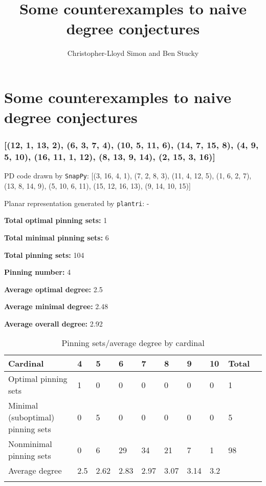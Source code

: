\documentclass{article}%
\title{Some counterexamples to naive degree conjectures}
\author{Christopher-Lloyd Simon and Ben Stucky}
\begin{document}
%

\section{Some counterexamples to naive degree conjectures}

\subsubsection{[(12, 1, 13, 2), (6, 3, 7, 4), (10, 5, 11, 6), (14, 7, 15, 8), (4, 9, 5, 10), (16, 11, 1, 12), (8, 13, 9, 14), (2, 15, 3, 16)]}

{\small\noindent PD code drawn by \texttt{SnapPy}: [(3, 16, 4, 1), (7, 2, 8, 3), (11, 4, 12, 5), (1, 6, 2, 7), (13, 8, 14, 9), (5, 10, 6, 11), (15, 12, 16, 13), (9, 14, 10, 15)]}

{\small\noindent Planar representation generated by \texttt{plantri}: -}

\begin{multicols}{2}
{\normalsize \noindent\textbf{Total optimal pinning sets:} 1

\noindent\textbf{Total minimal pinning sets:} 6

\noindent\textbf{Total pinning sets:} 104

\noindent\textbf{Pinning number:} 4

}
\columnbreak

{\normalsize \noindent\textbf{Average optimal degree:} 2.5

\noindent\textbf{Average minimal degree:} 2.48

\noindent\textbf{Average overall degree:} 2.92

}
\end{multicols}

\begin{table}[ht]
	\caption{Pinning sets/average degree by cardinal}
	\centering
	\renewcommand{\arraystretch}{1.5}
	\begin{tabularx}{\textwidth}{lXXXXXXXXX}
		\toprule
			Cardinal & 4 & 5 & 6 & 7 & 8 & 9 & 10 & Total\\
			\hline
			Optimal pinning sets & 1 & 0 & 0 & 0 & 0 & 0 & 0 & 1 \\
			Minimal (suboptimal) pinning sets & 0 & 5 & 0 & 0 & 0 & 0 & 0 & 5 \\
			Nonminimal pinning sets & 0 & 6 & 29 & 34 & 21 & 7 & 1 & 98 \\
			Average degree & 2.5 & 2.62 & 2.83 & 2.97 & 3.07 & 3.14 & 3.2 &  \\
		\bottomrule \\ 
	\end{tabularx}
\end{table}
\end{document}
